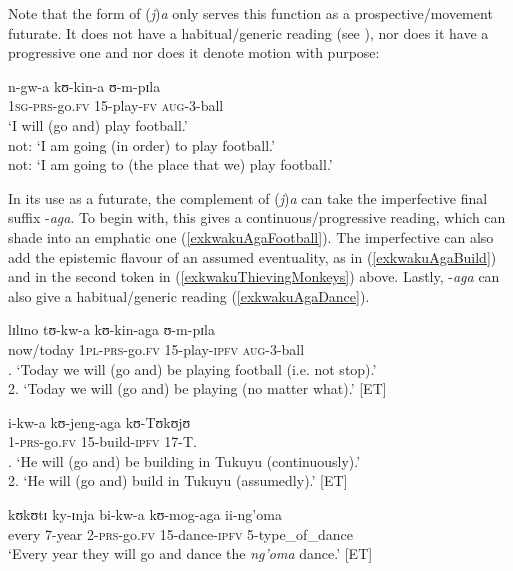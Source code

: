 Note that the  form of (\textit{j})\textit{a} only serves this function as a prospective/movement futurate. It does not have a habitual/generic reading (see ), nor does it have a progressive one and nor does it denote motion with purpose:

\begin{exe}
\ex \label{exKwaNotProg} \gll n-gw-a kʊ-kin-a ʊ-m-pɪla\\
\textsc{1sg}-\textsc{prs}-go.\textsc{fv} 15-play-\textsc{fv} \textsc{aug}-3-ball\\
\glt \lq I will (go and) play football.'\\
not: \lq I am going (in order) to play football.'\\
not: \lq I am going to (the place that we) play football.'
\end{exe}

In its use as a futurate, the complement of (\textit{j})\textit{a} can take the imperfective final suffix \mbox{-\textit{aga}}. To begin with, this gives a continuous/progressive reading, which can shade into an emphatic one (\ref{exkwakuAgaFootball}). The imperfective can also add the epistemic flavour of an assumed eventuality, as in (\ref{exkwakuAgaBuild}) and in the second token in (\ref{exkwakuThievingMonkeys}) above. Lastly, -\textit{aga} can also give a habitual/generic reading (\ref{exkwakuAgaDance}).

\begin{exe}
\ex \label{exkwakuAgaFootball}
\gll lɪlɪno tʊ-kw-a kʊ-kin-aga ʊ-m-pɪla\\
now/today \textsc{1pl}-\textsc{prs}-go.\textsc{fv} 15-play-\textsc{ipfv} \textsc{aug}-3-ball\\
. \lq Today we will (go and) be playing football (i.e. not stop).'\\
2. \lq Today we will (go and) be playing (no matter what).' [ET]

\ex \label{exkwakuAgaBuild}
\gll i-kw-a kʊ-jeng-aga kʊ-Tʊkʊjʊ\\
1-\textsc{prs}-go.\textsc{fv} 15-build-\textsc{ipfv} 17-T.\\
. \lq He will (go and) be building in Tukuyu (continuously).'\\
2. \lq He will (go and) build in Tukuyu (assumedly).' [ET]

\ex \label{exkwakuAgaDance}
 \gll kʊkʊtɪ ky-ɪnja bi-kw-a kʊ-mog-aga ii-ng'oma\\
every 7-year 2-\textsc{prs}-go.\textsc{fv} 15-dance-\textsc{ipfv} 5-type\_of\_dance\\
\glt \lq Every year they will go and dance the \textit{ng'oma} dance.' [ET]
\end{exe}
